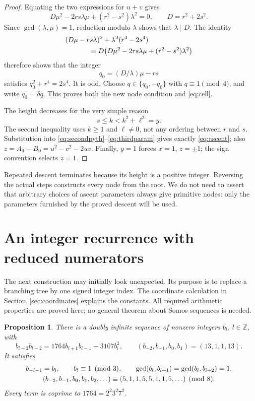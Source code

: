 \documentclass[11pt,a4paper]{article}
\newtheorem{proposition}[theorem]{Proposition}
\theoremstyle{definition}
\newcommand{\Z}{\mathbb Z}
\begin{document}
\begin{proof}
Equating the two expressions for \(u+v\) gives
\begin{equation}\label{eq:compatibility}
 D\mu^2-2rs\lambda\mu+(r^2-s^2)\lambda^2=0,
 \qquad D=r^2+2s^2.
\end{equation}
Since \(\gcd(\lambda,\mu)=1\), reduction modulo \(\lambda\)
shows that \(\lambda\mid D\). The identity
\begin{align*}
 &(D\mu-rs\lambda)^2+\lambda^2(r^4-2s^4)\\
 &\hspace{12mm}=D\bigl(D\mu^2-2rs\lambda\mu+(r^2-s^2)\lambda^2\bigr)
\end{align*}
therefore shows that the integer
\[
 q_0=(D/\lambda)\mu-rs
\]
satisfies \(q_0^2+r^4=2s^4\). It is odd. Choose
\(q\in\{q_0,-q_0\}\) with \(q\equiv1\pmod4\), and write
\(q_0=\delta q\). This proves both the new node condition and
\eqref{eq:cell}.

The height decreases for the very simple reason
\[
 s\le k<k^2+\ell^2=y.
\]
The second inequality uses \(k\ge1\) and \(\ell\ne0\), not any
ordering between \(r\) and \(s\). Substitution into
\eqref{eq:secondpyth}--\eqref{eq:thirdparam} gives exactly
\eqref{eq:ascent}; also \(z=A_0-B_0=u^2-v^2-2uv\).
Finally, \(y=1\) forces \(x=1\), \(z=\pm1\); the sign convention
selects \(z=1\).
\end{proof}

Repeated descent terminates because its height is a positive integer.
Reversing the actual steps constructs every node from the root.
We do not need to assert that arbitrary choices of ascent parameters
always give primitive nodes: only the parameters furnished by the
proved descent will be used.

\section{An integer recurrence with reduced numerators}\label{sec:somos}

The next construction may initially look unexpected. Its purpose is
to replace a branching tree by one signed integer index. The
coordinate calculation in Section~\ref{sec:coordinates} explains the
constants. All required arithmetic properties are proved here; no
general theorem about Somos sequences is needed.

\begin{proposition}\label{prop:b}
There is a doubly infinite sequence of nonzero integers \(b_l\),
\(l\in\Z\), with
\begin{equation}\label{eq:somos}
 b_{l+2}b_{l-2}=1764b_{l+1}b_{l-1}-3107b_l^2,
 \qquad (b_{-2},b_{-1},b_0,b_1)=(13,1,1,13).
\end{equation}
It satisfies
\begin{gather}\label{eq:b-properties}
 b_{-l-1}=b_l,\qquad b_l\equiv1\pmod3,\qquad
 \gcd(b_l,b_{l+1})=\gcd(b_l,b_{l+2})=1,\\
 (b_{-2},b_{-1},b_0,b_1,b_2,\ldots)
       \equiv(5,1,1,5,5,1,1,5,\ldots)\pmod8.\notag
\end{gather}
Every term is coprime to \(1764=2^2 3^2 7^2\).
\end{proposition}
\end{document}
